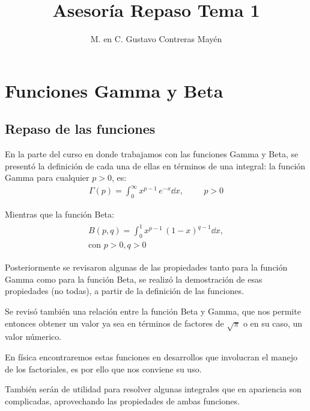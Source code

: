 
\title{Asesoría Repaso Tema 1 \vspace{-1ex}}
\author{M. en C. Gustavo Contreras Mayén}
\date{ }
\newcommand{\Cancel}[2][black]{{\color{#1}\cancel{\color{black}#2}}}

\vspace{-4cm}
\maketitle
\fontsize{14}{14}\selectfont
\tableofcontents
\newpage


\section{Funciones Gamma y Beta}
\subsection{Repaso de las funciones}


En la parte del curso en donde trabajamos con las funciones Gamma y Beta, se presentó la definición de cada una de ellas en términos de una integral: la función Gamma para cualquier $p >0$, es:
\begin{align*}
\Gamma (p) = \int_{0}^{\infty} x^{p-1} \, e^{-x} \dd{x}, \hspace{1cm} p > 0
\end{align*}

Mientras que la función Beta: 
\begin{align*}
\begin{gathered}
B(p, q) = \int_{0}^{1} x^{p-1} \, (1- x )^{q-1} \dd{x}, \\
\mbox{con }  p > 0, q > 0
\end{gathered}
\end{align*}

Posteriormente se revisaron algunas de las propiedades tanto para la función Gamma como para la función Beta, se realizó la demostración de esas propiedades (no todas), a partir de la definición de las funciones.

\par
Se revisó también una relación entre la función Beta y Gamma, que nos permite entonces obtener un valor ya sea en términos de factores de $\sqrt{\pi}$ o en su caso, un valor númerico.
\par
En física encontraremos estas funciones en desarrollos que involucran el manejo de los factoriales, es por ello que nos conviene su uso.
\par
También serán de utilidad para resolver algunas integrales que en apariencia son complicadas, aprovechando las propiedades de ambas funciones.

